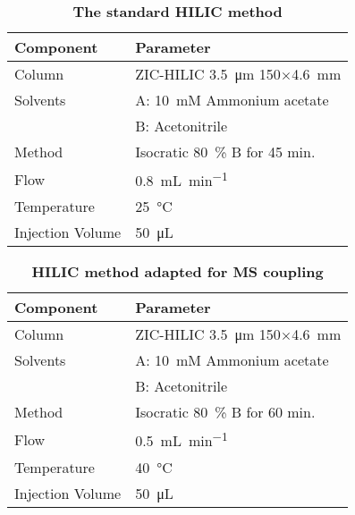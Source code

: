 	\begin{table}[htbp]
		\caption[The standard HILIC method]{\textbf{The standard HILIC method}}
		\label{tab:method_hilic_standard}
		\centering
		\begin{tabularx}{\textwidth}{XX}
			\toprule
			\textbf{Component}	& \textbf{Parameter}	\\
			\midrule
			Column 		& ZIC-HILIC \SI{3.5}{\micro\meter} 150$\times$\SI{4.6}{\milli\meter} 	\\
			Solvents	& A: 	10~mM Ammonium acetate 	\\
						& B: 	Acetonitrile 			\\
			Method 		& Isocratic 80~\% B for 45 min. 	\\
			Flow 		& \SI{0.8}{\milli\liter\per\minute} \\
			Temperature & \SI{25}{\celsius} 	\\
			Injection Volume 	& \SI{50}{\micro\liter} 	\\
			\bottomrule
		\end{tabularx}
	\end{table}

	\begin{table}[htbp]
		\caption[Standard aminocolumn method]{\textbf{HILIC method adapted for MS coupling}}
		\label{tab:method_hilic_ms}
		\centering
		\begin{tabularx}{\textwidth}{XX}
			\toprule
			\textbf{Component}	& \textbf{Parameter}	\\
			\midrule
			Column 		& ZIC-HILIC \SI{3.5}{\micro\meter} 150$\times$\SI{4.6}{\milli\meter} 	\\
			Solvents	& A: 	10~mM Ammonium acetate 	\\
						& B: 	Acetonitrile 			\\
			Method 		& Isocratic 80~\% B for 60 min. 	\\
			Flow 		& \SI{0.5}{\milli\liter\per\minute} \\
			Temperature & \SI{40}{\celsius} 	\\
			Injection Volume 	& \SI{50}{\micro\liter} 	\\
			\bottomrule
		\end{tabularx}
	\end{table}

